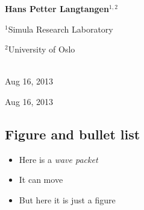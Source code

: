 \documentclass[%
oneside,                 %
final,                   %
10pt]{article}
\begin{document}
\begin{center}
\author{Hans Petter Langtangen}

\begin{center}
{\bf Hans Petter Langtangen${}^{1, 2}$} \\ [0mm]
\end{center}

\begin{center}
\centerline{{\small ${}^1$Simula Research Laboratory}}
\centerline{{\small ${}^2$University of Oslo}}
\end{center}


\date{Aug 16, 2013}
\maketitle
\date{Aug 16, 2013
}

\ \\ [10mm]
{\large\textsf{Aug 16, 2013}}

\end{center}
\vfill
\clearpage

\begin{center}
Aug 16, 2013
\end{center}

\vspace{1cm}




\subsection{Figure and bullet list}


\begin{itemize}
  \item Here is a \emph{wave packet}

  \item It can move

  \item But here it is just a figure
\end{itemize}

\noindent
\end{document}
